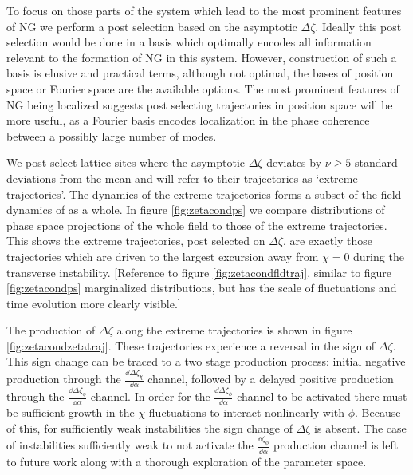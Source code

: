 To focus on those parts of the system which lead to the most prominent features of NG we perform a post selection based on the asymptotic $\Delta\zeta$.
Ideally this post selection would be done in a basis which optimally encodes all information relevant to the formation of NG in this system.
However, construction of such a basis is elusive and practical terms, although not optimal, the bases of position space or Fourier space are the available options. 
The most prominent features of NG being localized suggests post selecting trajectories in position space will be more useful, as a Fourier basis encodes localization in the phase coherence between a possibly large number of modes.

We post select lattice sites where the asymptotic $\Delta\zeta$ deviates by $\nu \ge 5$ standard deviations from the mean and will refer to their trajectories as `extreme trajectories'.
The dynamics of the extreme trajectories forms a subset of the field dynamics of as a whole.
In figure \ref{fig:zetacondps} we compare distributions of phase space projections of the whole field to those of the extreme trajectories.
This shows the extreme trajectories, post selected on $\Delta\zeta$, are exactly those trajectories which are driven to the largest excursion away from $\chi=0$ during the transverse instability.
[Reference to figure \ref{fig:zetacondfldtraj}, similar to figure \ref{fig:zetacondps} marginalized distributions, but has the scale of fluctuations and time evolution more clearly visible.]


The production of $\Delta\zeta$ along the extreme trajectories is shown in figure \ref{fig:zetacondzetatraj}.
These trajectories experience a reversal in the sign of $\Delta\zeta$.
This sign change can be traced to a two stage production process: initial negative production through the $\frac{\dd\Delta\zeta_\chi}{\dd\alpha}$ channel, followed by a delayed positive production through the $\frac{\dd\Delta\zeta_\phi}{\dd\alpha}$ channel.
In order for the $\frac{\dd\Delta\zeta_\phi}{\dd\alpha}$ channel to be activated there must be sufficient growth in the $\chi$ fluctuations to interact nonlinearly with $\phi$.
Because of this, for sufficiently weak instabilities the sign change of $\Delta\zeta$ is absent.
The case of instabilities sufficiently weak to not activate the $\frac{\dd\zeta_\phi}{\dd\alpha}$ production channel is left to future work along with a thorough exploration of the parameter space.

\Fdzetaphasespace
\Fzetacondps
\Fzetacondfldtraj
\Fzetacondzetatraj
